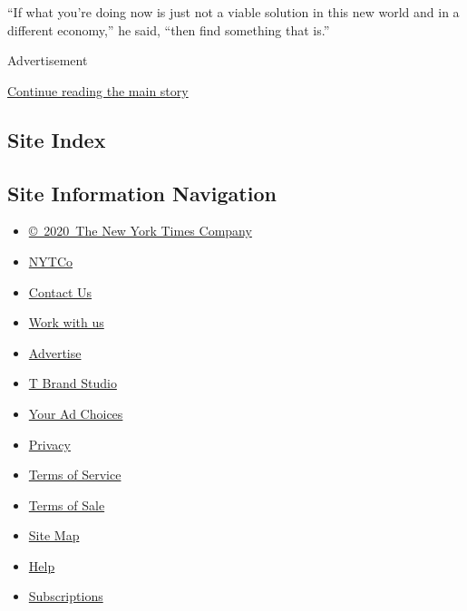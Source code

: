 ``If what you're doing now is just not a viable solution in this new
world and in a different economy,'' he said, ``then find something that
is.''

Advertisement

\protect\hyperlink{after-bottom}{Continue reading the main story}

\hypertarget{site-index}{%
\subsection{Site Index}\label{site-index}}

\hypertarget{site-information-navigation}{%
\subsection{Site Information
Navigation}\label{site-information-navigation}}

\begin{itemize}
\tightlist
\item
  \href{https://help.nytimes3xbfgragh.onion/hc/en-us/articles/115014792127-Copyright-notice}{©~2020~The
  New York Times Company}
\end{itemize}

\begin{itemize}
\tightlist
\item
  \href{https://www.nytco.com/}{NYTCo}
\item
  \href{https://help.nytimes3xbfgragh.onion/hc/en-us/articles/115015385887-Contact-Us}{Contact
  Us}
\item
  \href{https://www.nytco.com/careers/}{Work with us}
\item
  \href{https://nytmediakit.com/}{Advertise}
\item
  \href{http://www.tbrandstudio.com/}{T Brand Studio}
\item
  \href{https://www.nytimes3xbfgragh.onion/privacy/cookie-policy\#how-do-i-manage-trackers}{Your
  Ad Choices}
\item
  \href{https://www.nytimes3xbfgragh.onion/privacy}{Privacy}
\item
  \href{https://help.nytimes3xbfgragh.onion/hc/en-us/articles/115014893428-Terms-of-service}{Terms
  of Service}
\item
  \href{https://help.nytimes3xbfgragh.onion/hc/en-us/articles/115014893968-Terms-of-sale}{Terms
  of Sale}
\item
  \href{https://spiderbites.nytimes3xbfgragh.onion}{Site Map}
\item
  \href{https://help.nytimes3xbfgragh.onion/hc/en-us}{Help}
\item
  \href{https://www.nytimes3xbfgragh.onion/subscription?campaignId=37WXW}{Subscriptions}
\end{itemize}
